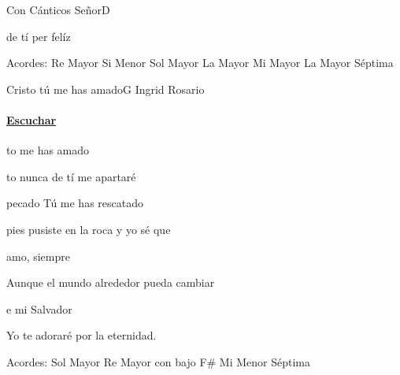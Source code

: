 \documentclass[12pt, spanish]{book}
\newcommand{\NotCCLIed}{\relax}
\begin{document}
\begin{song}{Con Cánticos Señor}{D}
\begin{SBChorus}
            de tí per felíz 
        \end{SBChorus}

        \ifChordBk
        \begin{SBOpGroup}
            Acordes:\break
            \upchord{\D}\qquad Re Mayor \hfill
            \upchord{\Bm}\qquad Si Menor \hfill\null\break
            \upchord{\G}\qquad Sol Mayor \hfill
            \upchord{\A}\qquad La Mayor \hfill\null\break
            \upchord{\E}\qquad Mi Mayor \hfill
            \upchord{\Aseven}\qquad La Mayor S\'eptima \hfill\null\break
        \end{SBOpGroup}
        \fi
    \end{song}

    \begin{song}{Cristo tú me has amado}{G}
    {} %
    {Ingrid Rosario}
    {} %
    {} %
        \ifChordBk
        \paragraph{\mbox{}\hfill\protect\href{https://open.spotify.com/intl-es/track/1o9hP3pRhkJ1wtaL3YdKrH}{Escuchar}\mbox{}\hfill}
        \fi

        \begin{SBOpGroup}
            to  me has amado

            to nunca de tí me apartaré

             pecado Tú me has rescatado

             pies pusiste en la roca y yo sé que
        \end{SBOpGroup}

        \begin{SBChorus}
             amo,  siempre

            Aunque el mundo alrededor pueda cambiar

             e mi Salvador

            Yo te adoraré por la eternidad.
        \end{SBChorus}

        \ifChordBk
        \begin{SBOpGroup}
            Acordes:
            \upchord{\G}\qquad Sol Mayor \hfill
            \upchord{\DFs}\qquad Re Mayor con bajo F\# \hfill\null\break
            \upchord{\Emseven}\qquad Mi Menor S\'eptima \hfill
        \end{SBOpGroup}
        \fi
    \end{song}
\end{document}
